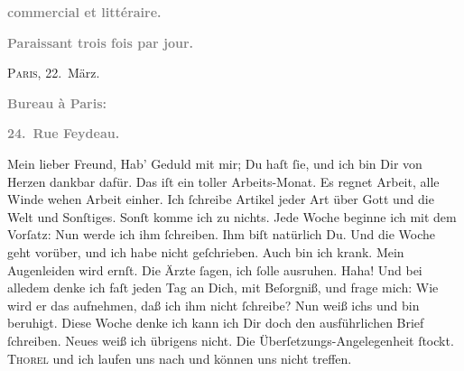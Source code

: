 \begin{ledgroupsized}[t]{13cm}
           \pstart
           \begin{otherlanguage}{french}\textcolor{gray}{\textbf{commercial et littéraire.}}\end{otherlanguage}\pend
           \pstart
           \begin{otherlanguage}{french}\textcolor{gray}{\textbf{\textbf{Paraissant trois fois par jour.}}}\end{otherlanguage}\hfill \textsc{Paris}, 22. März.\pend
           \pstart
           \begin{otherlanguage}{french}\textcolor{gray}{\textbf{\textbf{Bureau à Paris:}}}\end{otherlanguage}\pend
           \pstart
           \begin{otherlanguage}{french}\textcolor{gray}{\textbf{\textbf{24. Rue Feydeau.}}}\end{otherlanguage}\pend
           \pstart\center{}Mein lieber Freund,\pend\pstart
           Hab’ Geduld mit mir; Du haſt ſie, und ich bin Dir von Herzen dankbar dafür. Das iſt
               ein toller Arbeits-Monat. Es regnet Arbeit, alle Winde
               wehen Arbeit einher. Ich ſchreibe Artikel jeder Art über Gott und die Welt und
               Sonſtiges. Sonſt komme ich zu nichts. Jede Woche beginne ich mit dem Vorſatz: Nun
               werde ich ihm ſchreiben. Ihm biſt natürlich Du. Und die Woche geht vorüber, und ich
               habe nicht geſchrieben. {\pb}Auch bin ich krank. Mein
               Augenleiden wird ernſt. Die Ärzte ſagen, ich ſolle ausruhen. Haha! Und bei alledem
               denke ich faſt jeden Tag an Dich, mit Beſorgniß, und frage mich: Wie wird er das
               aufnehmen, daß ich ihm nicht ſchreibe? Nun weiß ichs und bin beruhigt. Diese Woche
               denke ich kann ich Dir doch den ausführlichen Brief ſchreiben. Neues weiß ich
               übrigens nicht. Die Überſetzungs-Angelegenheit ſtockt. \textsc{Thorel} und ich laufen uns nach und können {\pb}uns nicht
               treffen.\pend
           \pstart

\end{ledgroupsized}
